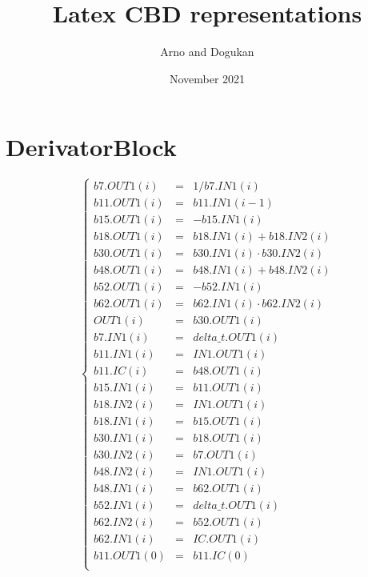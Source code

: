 \documentclass{article}
\title{Latex CBD representations}
\author{Arno and Dogukan }
\date{November 2021}
\begin{document}
\maketitle

\section{DerivatorBlock}
$$
\left\{\begin{array}{lcl}
	b7.OUT1(i) &=& 1/b7.IN1\left(i\right)\\
	b11.OUT1(i) &=& b11.IN1\left(i-1\right)\\
	b15.OUT1(i) &=& -b15.IN1\left(i\right)\\
	b18.OUT1(i) &=& b18.IN1\left(i\right) + b18.IN2\left(i\right)\\
	b30.OUT1(i) &=& b30.IN1\left(i\right) \cdot  b30.IN2\left(i\right)\\
	b48.OUT1(i) &=& b48.IN1\left(i\right) + b48.IN2\left(i\right)\\
	b52.OUT1(i) &=& -b52.IN1\left(i\right)\\
	b62.OUT1(i) &=& b62.IN1\left(i\right) \cdot  b62.IN2\left(i\right)\\
	OUT1(i) &=& b30.OUT1\left(i\right)\\
	b7.IN1(i) &=& delta\_t.OUT1\left(i\right)\\
	b11.IN1(i) &=& IN1.OUT1\left(i\right)\\
	b11.IC(i) &=& b48.OUT1\left(i\right)\\
	b15.IN1(i) &=& b11.OUT1\left(i\right)\\
	b18.IN2(i) &=& IN1.OUT1\left(i\right)\\
	b18.IN1(i) &=& b15.OUT1\left(i\right)\\
	b30.IN1(i) &=& b18.OUT1\left(i\right)\\
	b30.IN2(i) &=& b7.OUT1\left(i\right)\\
	b48.IN2(i) &=& IN1.OUT1\left(i\right)\\
	b48.IN1(i) &=& b62.OUT1\left(i\right)\\
	b52.IN1(i) &=& delta\_t.OUT1\left(i\right)\\
	b62.IN2(i) &=& b52.OUT1\left(i\right)\\
	b62.IN1(i) &=& IC.OUT1\left(i\right)\\
	b11.OUT1(0) &=& b11.IC(0)\\
\end{array}\right.
$$
\end{document}
